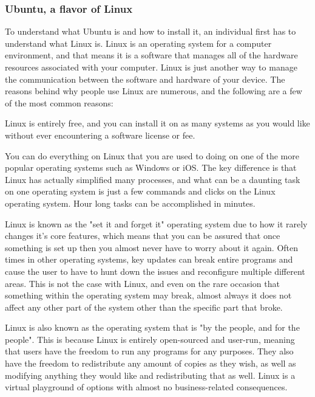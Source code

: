 \documentclass[12pt]{report}
\begin{document}
\subsubsection*{Ubuntu, a flavor of Linux}
To understand what Ubuntu is and how to install it, an individual first has to understand what Linux is. Linux is an operating system for a computer environment, and that means it is a software that manages all of the hardware resources associated with your computer. Linux is just another way to manage the communication between the software and hardware of your device.\cite{LinuxExplaination} The reasons behind why people use Linux are numerous, and the following are a few of the most common reasons:
\begin{description}[font=$\bullet$~\normalfont\scshape\color{red!50!black}]
	\item [Zero Cost of Entry] Linux is entirely free, and you can install it on as many systems as you would like without ever encountering a software license or fee.
	\item [Usability] You can do everything on Linux that you are used to doing on one of the more popular operating systems such as Windows or iOS. The key difference is that Linux has actually simplified many processes, and what can be a daunting task on one operating system is just a few commands and clicks on the Linux operating system. Hour long tasks can be accomplished in minutes.
	\item [System Administration] Linux is known as the "set it and forget it" operating system due to how it rarely changes it's core features, which means that you can be assured that once something is set up then you almost never have to worry about it again. Often times in other operating systems, key updates can break entire programs and cause the user to have to hunt down the issues and reconfigure multiple different areas. This is not the case with Linux, and even on the rare occasion that something within the operating system may break, almost always it does not affect any other part of the system other than the specific part that broke.
	\item [Open Source Licensing] Linux is also known as the operating system that is "by the people, and for the people". This is because Linux is entirely open-sourced and user-run, meaning that users have the freedom to run any programs for any purposes. They also have the freedom to redistribute any amount of copies as they wish, as well as modifying anything they would like and redistributing that as well. Linux is a virtual playground of options with almost no business-related consequences.
\end{description}
\end{document}
